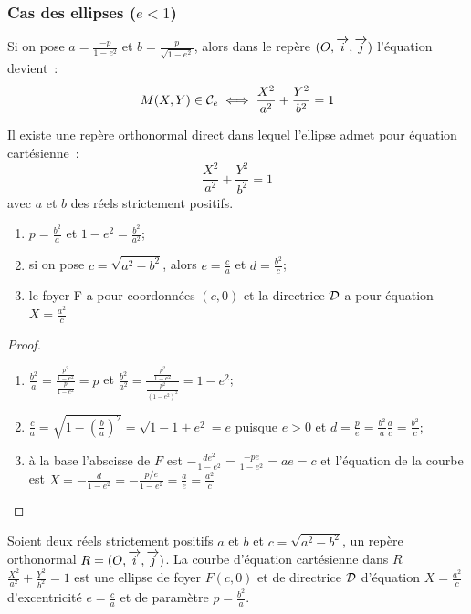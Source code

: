 \subsubsection{Cas des ellipses ($e<1$)}
Si on pose $a=\frac{-p}{1-e^2}$ et $b=\frac{p}{\sqrt{1-e^2}}$, alors dans le repère $(O,\overrightarrow{i},\overrightarrow{j})$ l'équation devient~:
\begin{equation}
  M(X,Y) \in \mathcal{C}_{e} \iff \frac{X^2}{a^2}+\frac{Y^2}{b^2}=1
\end{equation}
\begin{theo}
  Il existe une repère orthonormal direct dans lequel l'ellipse admet pour équation cartésienne~:
  \begin{equation}
    \frac{X^2}{a^2}+\frac{Y^2}{b^2}=1
  \end{equation}
  avec $a$ et $b$ des réels strictement positifs.
\end{theo}
\begin{prop}
  \begin{enumerate}
  \item $p=\frac{b^2}{a}$ et $1-e^2=\frac{b^2}{a^2}$;
  \item si on pose $c=\sqrt{a^2-b^2}$, alors $e=\frac{c}{a}$ et $d=\frac{b^2}{c}$;
  \item le foyer F a pour coordonnées $(c,0)$ et la directrice $\mathcal{D}$ a pour équation $X=\frac{a^2}{c}$
  \end{enumerate}
\end{prop}
\begin{proof}
  \begin{enumerate}
  \item $\frac{b^2}{a}=\frac{\frac{p^2}{1-e^2}}{\frac{p}{1-e^2}}=p$ et $\frac{b^2}{a^2}=\frac{\frac{p^2}{1-e^2}}{\frac{p^2}{(1-e^2)^2}}=1-e^2$;
  \item $\frac{c}{a}=\sqrt{1-\left(\frac{b}{a}\right)^2}=\sqrt{1-1+e^2}=e$ puisque $e>0$ et $d=\frac{p}{e}=\frac{b^2}{a} \frac{a}{c}=\frac{b^2}{c}$;
  \item à la base l'abscisse de $F$ est $-\frac{de^2}{1-e^2}=\frac{-pe}{1-e^2}=ae=c$ et l'équation de la courbe est $X=-\frac{d}{1-e^2}=-\frac{p/e}{1-e^2}=\frac{a}{e}=\frac{a^2}{c}$
  \end{enumerate}
\end{proof}
\begin{theo}
  Soient deux réels strictement positifs $a$ et $b$ et $c=\sqrt{a^2-b^2}$, un repère orthonormal $R=(O,\overrightarrow{i},\overrightarrow{j})$. La courbe d'équation cartésienne dans $R$ $\frac{X^2}{a^2}+\frac{Y^2}{b^2}=1$ est une ellipse de foyer $F(c,0)$ et de directrice $\mathcal{D}$ d'équation $X=\frac{a^2}{c}$ d'excentricité $e=\frac{c}{a}$ et de paramètre $p=\frac{b^2}{a}$.
\end{theo}
